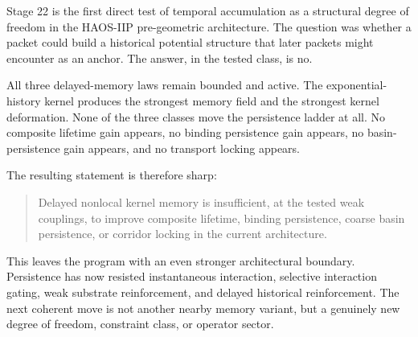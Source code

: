 \documentclass[11pt]{article}
\begin{document}
Stage 22 is the first direct test of temporal accumulation as a structural degree of freedom in the HAOS-IIP pre-geometric architecture. The question was whether a packet could build a historical potential structure that later packets might encounter as an anchor. The answer, in the tested class, is no.

All three delayed-memory laws remain bounded and active. The exponential-history kernel produces the strongest memory field and the strongest kernel deformation. None of the three classes move the persistence ladder at all. No composite lifetime gain appears, no binding persistence gain appears, no basin-persistence gain appears, and no transport locking appears.

The resulting statement is therefore sharp:

\begin{quote}
Delayed nonlocal kernel memory is insufficient, at the tested weak couplings, to improve composite lifetime, binding persistence, coarse basin persistence, or corridor locking in the current architecture.
\end{quote}

This leaves the program with an even stronger architectural boundary. Persistence has now resisted instantaneous interaction, selective interaction gating, weak substrate reinforcement, and delayed historical reinforcement. The next coherent move is not another nearby memory variant, but a genuinely new degree of freedom, constraint class, or operator sector.
\end{document}

